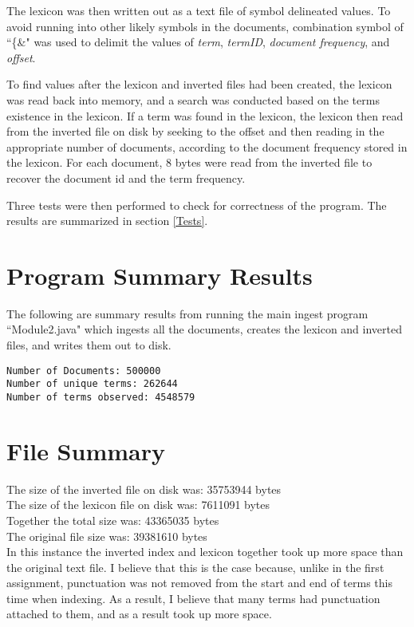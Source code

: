 \documentclass{article}
\begin{document}
The lexicon was then written out as a text file of symbol delineated values. To avoid running into other likely symbols in the documents, combination symbol of ``\{\&" was used to delimit the values of \textit{term}, \textit{termID}, \textit{document frequency}, and \textit{offset}.

To find values after the lexicon and inverted files had been created, the lexicon was read back into memory, and a search was conducted based on the terms existence in the lexicon. If a term was found in the lexicon, the lexicon then read from the inverted file on disk by seeking to the offset and then reading in the appropriate number of documents, according to the document frequency stored in the lexicon. For each document, 8 bytes were read from the inverted file to recover the document id and the term frequency. 

Three tests were then performed to check for correctness of the program. The results are summarized in section \ref{Tests}.


\section{Program Summary Results}
The following are summary results from running the main ingest program ``Module2.java" which ingests all the documents, creates the lexicon and inverted files, and writes them out to disk. 

\begin{verbatim}
Number of Documents: 500000
Number of unique terms: 262644
Number of terms observed: 4548579
\end{verbatim}

\section{File Summary}
The size of the inverted file on disk was: 35753944 bytes \\
The size of the lexicon file on disk was: 7611091 bytes \\
Together the total size was: 43365035 bytes \\
The original file size was: 39381610 bytes \\

In this instance the inverted index and lexicon together took up more space than the original text file. I believe that this is the case because, unlike in the first assignment, punctuation was not removed from the start and end of terms this time when indexing. As a result, I believe that many terms had punctuation attached to them, and as a result took up more space. 
\end{document}
